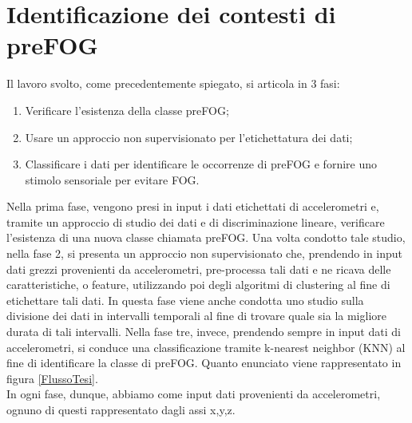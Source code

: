 

\chapter[Identificazione dei contesti di preFOG]{Identificazione dei contesti di preFOG}\label{chap5:Automatic}
Il lavoro svolto, come precedentemente spiegato, si articola in 3 fasi:
\begin{enumerate}
	\item Verificare l'esistenza della classe preFOG;
	\item Usare un approccio non supervisionato per l'etichettatura dei dati;
	\item Classificare i dati per identificare le occorrenze di preFOG e fornire uno stimolo sensoriale per evitare FOG.
\end{enumerate}
Nella prima fase, vengono presi in input i dati etichettati di accelerometri e, tramite un approccio di studio dei dati e di discriminazione lineare, verificare l'esistenza di una nuova classe chiamata preFOG. Una volta condotto tale studio, nella fase 2, si presenta un approccio non supervisionato che, prendendo in input dati grezzi provenienti da accelerometri, pre-processa tali dati e ne ricava delle caratteristiche, o feature, utilizzando poi degli algoritmi di clustering al fine di etichettare tali dati. In questa fase viene anche condotta uno studio sulla divisione dei dati in intervalli temporali al fine di trovare quale sia la migliore durata di tali intervalli. Nella fase tre, invece, prendendo sempre in input dati di accelerometri, si conduce una classificazione tramite k-nearest neighbor (KNN) al fine di identificare la classe di preFOG. Quanto enunciato viene rappresentato in figura \ref{FlussoTesi}.\\
In ogni fase, dunque, abbiamo come input dati provenienti da accelerometri, ognuno di questi rappresentato dagli assi x,y,z.\\
